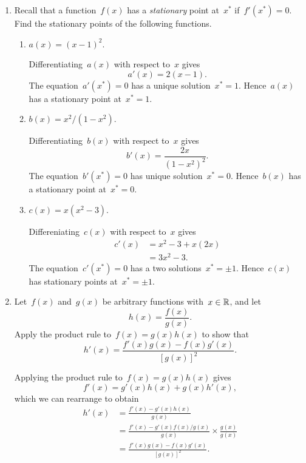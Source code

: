 
\begin{enumerate}

	\item
	Recall that a function~$f(x)$ has a \emph{stationary} point at~$x^*$ if~$f'(x^*)=0$.
	Find the stationary points of the following functions.
	\begin{enumerate}

		\item
		$a(x)=(x-1)^2$.
		\begin{solution}
			Differentiating~$a(x)$ with respect to~$x$ gives
			\[ a'(x)=2(x-1). \]
			The equation~$a'(x^*)=0$ has a unique solution~$x^*=1$.
			Hence~$a(x)$ has a stationary point at~$x^*=1$.
		\end{solution}

		\item
		$b(x)=x^2/(1-x^2)$.
		\begin{solution}
			Differentiating~$b(x)$ with respect to~$x$ gives
			\[ b'(x)=\frac{2x}{(1-x^2)^2}. \]
			The equation~$b'(x^*)=0$ has unique solution~$x^*=0$.
			Hence~$b(x)$ has a stationary point at~$x^*=0$.
		\end{solution}

		\item
		$c(x)=x(x^2-3)$.
		\begin{solution}
			Differeniating~$c(x)$ with respect to~$x$ gives
			\begin{align}
				c'(x)
				&= x^2-3+x(2x)\\
				&= 3x^2-3.
			\end{align}
			The equation~$c'(x^*)=0$ has a two solutions~$x^*=\pm1$.
			Hence~$c(x)$ has stationary points at~$x^*=\pm1$.
		\end{solution}

	\end{enumerate}

	\item
	Let~$f(x)$ and~$g(x)$ be arbitrary functions with~$x\in\mathbb{R}$, and let
	\[ h(x)=\frac{f(x)}{g(x)}. \]
	Apply the product rule to~$f(x)=g(x)h(x)$ to show that
	\[ h'(x)=\frac{f'(x)g(x)-f(x)g'(x)}{[g(x)]^2}. \]
	\begin{solution}
		Applying the product rule to~$f(x)=g(x)h(x)$ gives
		\[ f'(x)=g'(x)h(x)+g(x)h'(x), \]
		which we can rearrange to obtain
		\begin{align}
			h'(x)
			&= \frac{f'(x)-g'(x)h(x)}{g(x)}\\
			&= \frac{f'(x)-g'(x)f(x)/g(x)}{g(x)}\times\frac{g(x)}{g(x)}\\
			&= \frac{f'(x)g(x)-f(x)g'(x)}{[g(x)]^2}.
		\end{align}
	\end{solution}


\end{enumerate}

